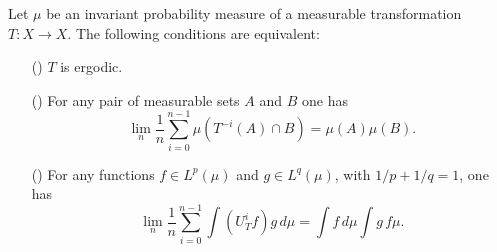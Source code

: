 \begin{proposition}\label{ergodic iff Koopman operator}
Let $\mu$ be an invariant probability measure of a measurable transformation $T:X\to X$. The following conditions are equivalent:
\begin{itemize}
\item[(\rmnum{1})] $T$ is ergodic.
\item[(\rmnum{2})] For any pair of measurable sets $A$ and $B$ one has
\[\lim_n\frac{1}{n}\sum_{i=0}^{n-1}\mu(T^{-i}(A)\cap B)=\mu(A)\mu(B).\] 
\item[(\rmnum{3})] For any functions $f\in L^p(\mu)$ and $g\in L^q(\mu)$, with $1/p+1/q=1$, one has
\[\lim_n\frac{1}{n}\sum_{i=0}^{n-1}\int(U_T^if)g\,d\mu=\int f\,d\mu\int g\,f\mu.\] 
\end{itemize}
\end{proposition}
